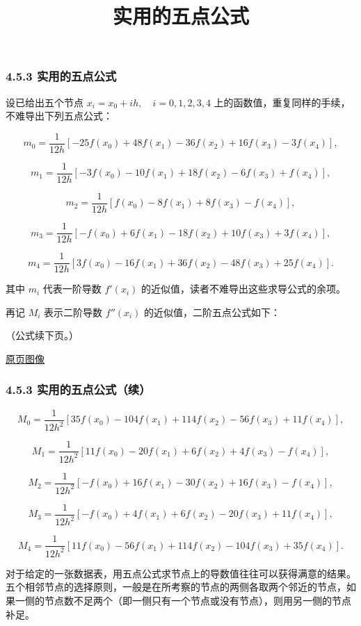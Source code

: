 \documentclass[
  10pt,
  fontset=fandol]{ctexart}
\title{实用的五点公式}
\author{}
\date{}
\begin{document}
\maketitle

\subsubsection{4.5.3 实用的五点公式}\label{ux5b9eux7528ux7684ux4e94ux70b9ux516cux5f0f}

设已给出五个节点 \(x_i=x_0+ih,\allowbreak \quad i=0,\allowbreak 1,\allowbreak 2,\allowbreak 3,\allowbreak 4\) 上的函数值，重复同样的手续，不难导出下列五点公式：

\[
m_0=\frac1{12h}[-25f(x_0)+48f(x_1)-36f(x_2)+16f(x_3)-3f(x_4)],
\]

\[
m_1=\frac1{12h}[-3f(x_0)-10f(x_1)+18f(x_2)-6f(x_3)+f(x_4)],
\]

\[
m_2=\frac1{12h}[f(x_0)-8f(x_1)+8f(x_3)-f(x_4)],
\]

\[
m_3=\frac1{12h}[-f(x_0)+6f(x_1)-18f(x_2)+10f(x_3)+3f(x_4)],
\]

\[
m_4=\frac1{12h}[3f(x_0)-16f(x_1)+36f(x_2)-48f(x_3)+25f(x_4)].
\]

其中 \(m_i\) 代表一阶导数 \(f'(x_i)\) 的近似值，读者不难导出这些求导公式的余项。

再记 \(M_i\) 表示二阶导数 \(f''(x_i)\) 的近似值，二阶五点公式如下：

（公式续下页。）

\href{../../source-images/pdf-116.jpeg}{原页图像}

\subsubsection{4.5.3 实用的五点公式（续）}\label{ux5b9eux7528ux7684ux4e94ux70b9ux516cux5f0fux7eed}

\[
M_0=\frac1{12h^2}[35f(x_0)-104f(x_1)+114f(x_2)-56f(x_3)+11f(x_4)],
\]

\[
M_1=\frac1{12h^2}[11f(x_0)-20f(x_1)+6f(x_2)+4f(x_3)-f(x_4)],
\]

\[
M_2=\frac1{12h^2}[-f(x_0)+16f(x_1)-30f(x_2)+16f(x_3)-f(x_4)],
\]

\[
M_3=\frac1{12h^2}[-f(x_0)+4f(x_1)+6f(x_2)-20f(x_3)+11f(x_4)],
\]

\[
M_4=\frac1{12h^2}[11f(x_0)-56f(x_1)+114f(x_2)-104f(x_3)+35f(x_4)].
\]

对于给定的一张数据表，用五点公式求节点上的导数值往往可以获得满意的结果。五个相邻节点的选择原则，一般是在所考察的节点的两侧各取两个邻近的节点，如果一侧的节点数不足两个（即一侧只有一个节点或没有节点），则用另一侧的节点补足。
\end{document}
